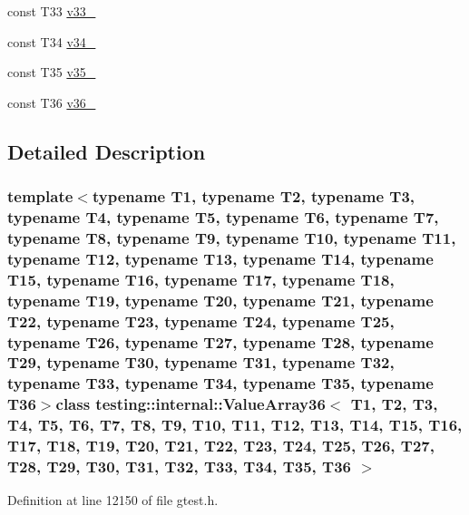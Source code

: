 \begin{DoxyCompactItemize}
\item 
const \-T33 \hyperlink{classtesting_1_1internal_1_1ValueArray36_a7a6cefe370b709c3a7b35b6d5ca8c778}{v33\-\_\-}
\item 
const \-T34 \hyperlink{classtesting_1_1internal_1_1ValueArray36_ab379e4d515d66bc57e05267515fab1d9}{v34\-\_\-}
\item 
const \-T35 \hyperlink{classtesting_1_1internal_1_1ValueArray36_a0a36112ac9b7a13572874977627ed192}{v35\-\_\-}
\item 
const \-T36 \hyperlink{classtesting_1_1internal_1_1ValueArray36_a531a52e3e8de6e982edd23c2547e4c49}{v36\-\_\-}
\end{DoxyCompactItemize}


\subsection{\-Detailed \-Description}
\subsubsection*{template$<$typename T1, typename T2, typename T3, typename T4, typename T5, typename T6, typename T7, typename T8, typename T9, typename T10, typename T11, typename T12, typename T13, typename T14, typename T15, typename T16, typename T17, typename T18, typename T19, typename T20, typename T21, typename T22, typename T23, typename T24, typename T25, typename T26, typename T27, typename T28, typename T29, typename T30, typename T31, typename T32, typename T33, typename T34, typename T35, typename T36$>$class testing\-::internal\-::\-Value\-Array36$<$ T1, T2, T3, T4, T5, T6, T7, T8, T9, T10, T11, T12, T13, T14, T15, T16, T17, T18, T19, T20, T21, T22, T23, T24, T25, T26, T27, T28, T29, T30, T31, T32, T33, T34, T35, T36 $>$}



\-Definition at line 12150 of file gtest.\-h.




